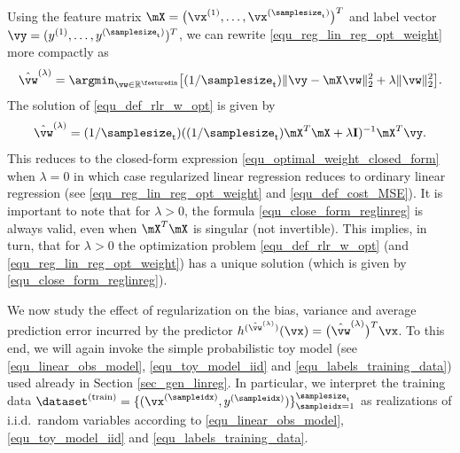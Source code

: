 \documentclass[12pt]{report}
\begin{document}

Using the feature matrix $\mX=\big(\vx^{(1)},\ldots,\vx^{(\samplesize_{\rm t})}\big)^{T}$ 
and label vector $\vy=(y^{(1)},\ldots,y^{(\samplesize_{\rm t})})^{T}$, 
we can rewrite \eqref{equ_reg_lin_reg_opt_weight} more compactly as 
\begin{equation} 
\label{equ_def_rlr_w_opt}
\hat{\vw}^{(\lambda)} = \argmin_{\vw \in \mathbb{R}^{\featuredim}} \big[ (1/\samplesize_{\rm t}) \| \vy - \mX \vw \|^{2}_{2} + \lambda \| \vw \|^{2}_{2}\big].
\end{equation} 
The solution of \eqref{equ_def_rlr_w_opt} is given by 
\begin{equation}
\label{equ_close_form_reglinreg}
\hat{\vw}^{(\lambda)} = (1/\samplesize_{\rm t}) ((1/\samplesize_{\rm t}) \mX^{T} \mX + \lambda \mathbf{I})^{-1} \mX^{T} \vy. 
\end{equation}
This reduces to the closed-form expression \eqref{equ_optimal_weight_closed_form} 
when $\lambda=0$ in which case regularized linear regression reduces to ordinary linear 
regression (see \eqref{equ_reg_lin_reg_opt_weight} and \eqref{equ_def_cost_MSE}). It 
is important to note that for $\lambda>0$, the formula \eqref{equ_close_form_reglinreg} 
is always valid, even when $\mX^{T} \mX$ is singular (not invertible). This implies, in turn, 
that for $\lambda> 0$ the optimization problem \eqref{equ_def_rlr_w_opt} (and \eqref{equ_reg_lin_reg_opt_weight}) 
has a unique solution (which is given by \eqref{equ_close_form_reglinreg}). 

We now study the effect of regularization on the bias, variance 
and average prediction error incurred by the predictor $h^{(\hat{\vw}^{(\lambda)})}(\vx) = \big(\hat{\vw}^{(\lambda)}\big)^{T} \vx$. 
To this end, we will again invoke the simple probabilistic toy 
model (see \eqref{equ_linear_obs_model}, \eqref{equ_toy_model_iid} 
and \eqref{equ_labels_training_data}) used already in Section \ref{sec_gen_linreg}. 
In particular, we interpret the training data $\dataset^{(\rm train)} = \{ (\vx^{(\sampleidx)},y^{(\sampleidx)}) \}_{\sampleidx=1}^{\samplesize_{\rm t}}$ 
as realizations of i.i.d.\ random variables according to \eqref{equ_linear_obs_model}, 
\eqref{equ_toy_model_iid} and \eqref{equ_labels_training_data}. 
\end{document}
